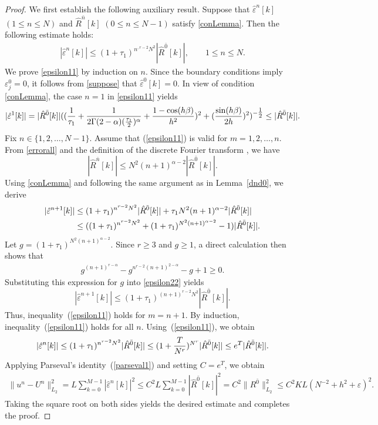 \documentclass[10pt, reqno]{amsart}
\theoremstyle{remark}
\theoremstyle{definition}
\numberwithin{table}{section}
\begin{document}
    \begin{proof}
    We first establish the following auxiliary result. Suppose that $\hat{\varepsilon}^n[k]$ $(1 \le n \le N)$ and $\hat{R}^{\bar{n}}[k]$ $(0 \le n \le N-1)$ satisfy \eqref{conLemma}. Then the following estimate holds:
\begin{align}
|\hat{\varepsilon}^n[k]| \le (1+\tau_1)^{n^{,r-2} N^{2}}  |\hat{R}^{\bar 0}[k]|,
\qquad 1 \le n \le N. \label{epsilon11}
\end{align}
We prove \eqref{epsilon11} by induction on $n$.
Since the boundary conditions imply $\varepsilon_j^0 = 0$, it follows from \eqref{suppose} that $\hat{\varepsilon}^0[k] = 0$. In view of condition \eqref{conLemma}, the case $n=1$ in \eqref{epsilon11} yields
    \begin{align}
    |\hat{\varepsilon}^{1}[k]|
    =|\hat{R}^{\bar 0}[k]|({( \frac{1}{\tau_1}+\frac{1}{2\Gamma(2-\alpha)(\frac{\tau_{1}}{2})^\alpha}+\frac{1-\cos(h\beta)}{h^2})^2+(\frac{\sin(h\beta)}{2h})^2})^{-\tfrac{1}{2}}\leq |\hat{R}^{\bar 0}[k]|.\notag
\end{align}
Fix $n\in\{1,2,\dots,N-1\}$. Assume that (\ref{epsilon11}) is valid for $m=1,2,\dots,n$. From \eqref{errorall} and the definition of the discrete Fourier transform \cite{chen2007,Liu2018, zhao2021}, we have
\[
|\hat{R}^{\bar n}[k]| \le {N^2}{(n+1)^{\alpha-2}} |\hat{R}^{\bar 0}[k]|.
\]
Using \eqref{conLemma} and following the same argument as in Lemma~\ref{dnd0}, we derive
\begin{align}
|\hat{\varepsilon}^{n+1}[k]|
&\le (1+\tau_1)^{n^{r-2}N^2} |\hat{R}^{\bar 0}[k]|
+ \tau_1 {N^2}{(n+1)^{\alpha-2}} |\hat{R}^{\bar 0}[k]| \notag \\
&\le ( (1+\tau_1)^{n^{r-2}N^2} + (1+\tau_1)^{{N^2}{(n+1)^{\alpha-2}}} - 1 ) |\hat{R}^{\bar 0}[k]|.\label{epsilon22}
\end{align}
Let $g = (1+\tau_1)^{{N^2}{(n+1)^{\alpha-2}}}$. 
Since $r \ge 3$ and $g\ge1$, a direct calculation then shows that
\begin{align*}
    g^{(n+1)^{r-\alpha}}-g^{n^{r-2}(n+1)^{2-\alpha}}-g+1\ge 0.
\end{align*}
Substituting this expression for $g$ into \eqref{epsilon22} yields
\[
|\hat{\varepsilon}^{n+1}[k]| \le (1+\tau_1)^{(n+1)^{r-2}N^2} |\hat{R}^{\bar 0}[k]|.
\]
Thus, inequality~(\ref{epsilon11}) holds for $m = n + 1$. By induction, inequality~(\ref{epsilon11}) holds for all $n$.
Using~(\ref{epsilon11}), we obtain
\begin{align}
    |\hat{\varepsilon}^n[k]|\leq (1+\tau_1)^{n^{r-2}N^{2}}|\hat{R}^{\bar 0}[k]|\leq (1+\frac{T}{N^r})^{N^r}|\hat{R}^{\bar 0}[k]|\leq e^T|\hat{R}^{\bar 0}[k]|.\notag
\end{align}
    Applying Parseval’s identity~(\ref{parseval1}) and setting $C = e^{T}$, we obtain
    \begin{equation}
\begin{aligned}
\|u^n-U^n\|_{L_2}^2 =L\sum_{k=0}^{M-1}|\hat{\varepsilon}^n[k]|^2\leq C^2L \sum_{k=0}^{M-1}|\hat{R}^{\bar 0}[k]|^2=C^2\|R^{\bar 0}\|_{L_2}^2\leq C^2KL(N^{-2}+h^2+\varepsilon)^2. 
\end{aligned}
\end{equation}
Taking the square root on both sides yields the desired estimate and completes the proof.  
\end{proof}
\end{document}

